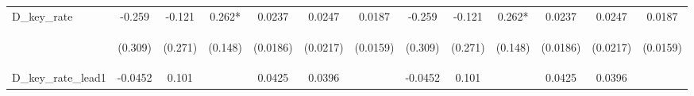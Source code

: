 \documentclass[]{article}
\begin{document}
\begin{center}
\begin{tabular}{lcccccccccccc}
D\_key\_rate & -0.259 & -0.121 & 0.262* & 0.0237 & 0.0247 & 0.0187 & -0.259 & -0.121 & 0.262* & 0.0237 & 0.0247 & 0.0187 \\
\vspace{4pt} & \begin{footnotesize}(0.309)\end{footnotesize} & \begin{footnotesize}(0.271)\end{footnotesize} & \begin{footnotesize}(0.148)\end{footnotesize} & \begin{footnotesize}(0.0186)\end{footnotesize} & \begin{footnotesize}(0.0217)\end{footnotesize} & \begin{footnotesize}(0.0159)\end{footnotesize} & \begin{footnotesize}(0.309)\end{footnotesize} & \begin{footnotesize}(0.271)\end{footnotesize} & \begin{footnotesize}(0.148)\end{footnotesize} & \begin{footnotesize}(0.0186)\end{footnotesize} & \begin{footnotesize}(0.0217)\end{footnotesize} & \begin{footnotesize}(0.0159)\end{footnotesize} \\
D\_key\_rate\_lead1 & -0.0452 & 0.101 &  & 0.0425 & 0.0396 &  & -0.0452 & 0.101 &  & 0.0425 & 0.0396 &  \\

\end{tabular}
\end{center}
\end{document}
